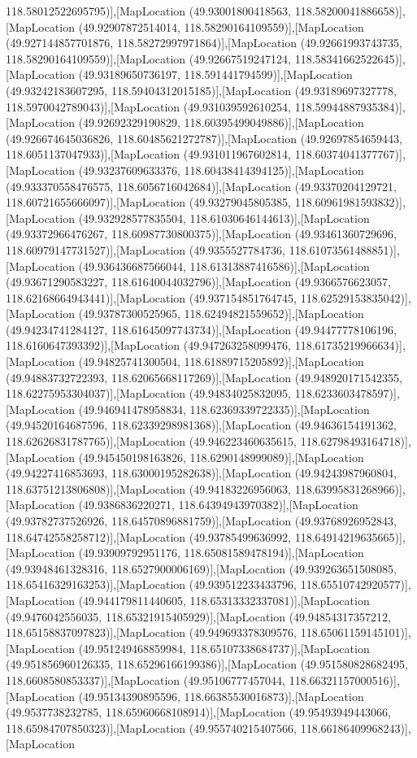 118.58012522695795)],[MapLocation (49.93001800418563, 118.58200041886658)],[MapLocation (49.92907872514014, 118.58290164109559)],[MapLocation (49.927144857701876, 118.58272997971864)],[MapLocation (49.92661993743735, 118.58290164109559)],[MapLocation (49.92667519247124, 118.58341662522645)],[MapLocation (49.93189650736197, 118.591441794599)],[MapLocation (49.93242183607295, 118.59404312015185)],[MapLocation (49.93189697327778, 118.5970042789043)],[MapLocation (49.931039592610254, 118.59944887935384)],[MapLocation (49.92692329190829, 118.60395499049886)],[MapLocation (49.926674645036826, 118.60485621272787)],[MapLocation (49.92697854659443, 118.6051137047933)],[MapLocation (49.931011967602814, 118.60374041377767)],[MapLocation (49.93237609633376, 118.60438414394125)],[MapLocation (49.933370558476575, 118.6056716042684)],[MapLocation (49.93370204129721, 118.60721655666097)],[MapLocation (49.93279045805385, 118.60961981593832)],[MapLocation (49.932928577835504, 118.61030646144613)],[MapLocation (49.93372966476267, 118.60987730800375)],[MapLocation (49.93461360729696, 118.60979147731527)],[MapLocation (49.9355527784736, 118.61073561488851)],[MapLocation (49.936436687566044, 118.61313887416586)],[MapLocation (49.93671290583227, 118.61640044032796)],[MapLocation (49.9366576623057, 118.62168664943441)],[MapLocation (49.937154851764745, 118.62529153835042)],[MapLocation (49.93787300525965, 118.62494821559652)],[MapLocation (49.94234741284127, 118.61645097743734)],[MapLocation (49.94477778106196, 118.6160647393392)],[MapLocation (49.947263258099476, 118.61735219966634)],[MapLocation (49.94825741300504, 118.61889715205892)],[MapLocation (49.94883732722393, 118.62065668117269)],[MapLocation (49.948920171542355, 118.62275953304037)],[MapLocation (49.94834025832095, 118.6233603478597)],[MapLocation (49.946941478958834, 118.62369339722335)],[MapLocation (49.94520164687596, 118.62339298981368)],[MapLocation (49.94636154191362, 118.62626831787765)],[MapLocation (49.946223460635615, 118.62798493164718)],[MapLocation (49.945450198163826, 118.6290148999089)],[MapLocation (49.94227416853693, 118.63000195282638)],[MapLocation (49.94243987960804, 118.63751213806808)],[MapLocation (49.94183226956063, 118.63995831268966)],[MapLocation (49.9386836220271, 118.64394943970382)],[MapLocation (49.93782737526926, 118.64570896881759)],[MapLocation (49.93768926952843, 118.64742558258712)],[MapLocation (49.93785499636992, 118.64914219635665)],[MapLocation (49.93909792951176, 118.65081589478194)],[MapLocation (49.93948461328316, 118.6527900006169)],[MapLocation (49.939263651508085, 118.65416329163253)],[MapLocation (49.939512233433796, 118.65510742920577)],[MapLocation (49.944179811440605, 118.65313332337081)],[MapLocation (49.9476042556035, 118.65321915405929)],[MapLocation (49.94854317357212, 118.65158837097823)],[MapLocation (49.949693378309576, 118.65061159145101)],[MapLocation (49.951249468859984, 118.65107338684737)],[MapLocation (49.951856960126335, 118.65296166199386)],[MapLocation (49.951580828682495, 118.6608580853337)],[MapLocation (49.95106777457044, 118.66321157000516)],[MapLocation (49.95134390895596, 118.66385530016873)],[MapLocation (49.9537738232785, 118.65960668108914)],[MapLocation (49.95493949443066, 118.65984707850323)],[MapLocation (49.955740215407566, 118.66186409968243)],[MapLocation 